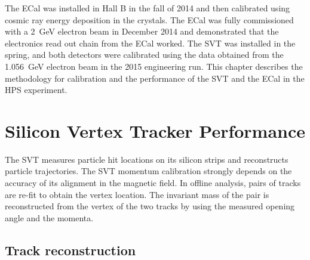 The ECal was installed in Hall B in the fall of 2014 and then calibrated using cosmic ray energy deposition in the crystals. The ECal was fully commissioned with a 2~GeV electron beam in December 2014 and demonstrated that the electronics read out chain from the ECal worked. The SVT was installed in the spring, and both detectors were calibrated using the data obtained from the 1.056~GeV electron beam in the 2015 engineering run. This chapter describes the methodology for calibration and the performance of the SVT and the ECal in the HPS experiment. 

\section{Silicon Vertex Tracker Performance}
The SVT measures particle hit locations on its silicon strips and reconstructs particle trajectories. The SVT momentum calibration strongly depends on the accuracy of its alignment in the magnetic field. In offline analysis, pairs of tracks are re-fit to obtain the vertex location. The invariant mass of the pair is reconstructed from the vertex of the two tracks by using the measured opening angle and the momenta. 

\subsection{Track reconstruction}

